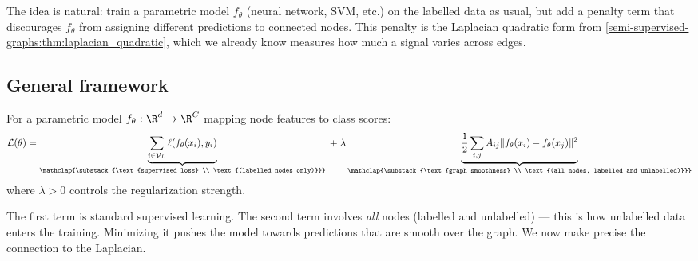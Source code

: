 \begin{notechapter}
The idea is natural: train a parametric model $f_\theta$ (neural network, SVM,
etc.) on the labelled data as usual, but add a penalty term that discourages
$f_\theta$ from assigning different predictions to connected nodes. This
penalty is the Laplacian quadratic form from \cref{semi-supervised-graphs:thm:laplacian_quadratic},
which we already know measures how much a signal varies across edges.

\subsection{General framework}

\begin{definition}
\label{semi-supervised-graphs:def:graph_reg}
For a parametric model $f_\theta: \R^d \to \R^C$ mapping node features to
class scores:
\begin{equation}
\label{semi-supervised-graphs:eq:graph_reg}
\mathcal{L}(\theta) =
\underbrace{
    \sum_{i \in \mathcal{V}_L}\ell(f_\theta(x_i), y_i)}_{
        \mathclap{\substack{\text{supervised loss} \\
        \text{(labelled nodes only)}}}} \; + \;
\lambda\underbrace{\frac{1}{2}\sum_{i,j}A_{ij}\|f_\theta(x_i) -
f_\theta(x_j)\|^2}_{\mathclap{\substack{\text{graph smoothness} \\
\text{(all nodes, labelled and unlabelled)}}}}
\end{equation}
where $\lambda > 0$ controls the regularization strength.
\end{definition}

The first term is standard supervised learning. The second term involves
\emph{all} nodes (labelled and unlabelled) --- this is how unlabelled data enters
the training. Minimizing it pushes the model towards predictions that are smooth
over the graph. We now make precise the connection to the Laplacian.


\end{notechapter}
